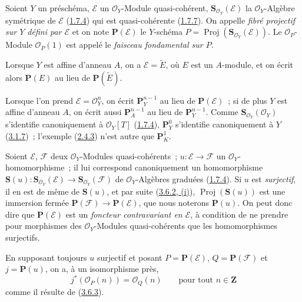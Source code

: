 \begin{definition}[4.1.1]
\label{II.4.1.1-fr}
Soient $Y$ un préschéma, $\mathcal{E}$ un $\mathcal{O}_Y$-Module
quasi-cohérent, $\mathbf{S}_{\mathcal{O}_Y}(\mathcal{E})$ la
$\mathcal{O}_Y$-Algèbre symétrique de $\mathcal{E}$
(\hyperref[II.1.7.4-fr]{1.7.4}) qui est quasi-cohérente
(\hyperref[II.1.7.7-fr]{1.7.7}). On appelle \emph{fibré projectif sur $Y$
défini par $\mathcal{E}$} et on note $\mathbf{P}(\mathcal{E})$ le $Y$-schéma
$P=\operatorname{Proj}(\mathbf{S}_{\mathcal{O}_Y}(\mathcal{E}))$. Le
$\mathcal{O}_P$-Module $\mathcal{O}_P(1)$ est appelé le \emph{faisceau
fondamental sur $P$}.
\end{definition}

Lorsque $Y$ est affine d'anneau $A$, on a $\mathcal{E}=\widetilde{E}$, où
$E$ est un $A$-module, et on écrit alors $\mathbf{P}(E)$ au lieu de
$\mathbf{P}(\widetilde{E})$.

Lorsque l'on prend $\mathcal{E}=\mathcal{O}_Y^n$, on écrit
$\mathbf{P}_Y^{n-1}$ au lieu de $\mathbf{P}(\mathcal{E})$~; si de plus $Y$
est affine d'anneau $A$, on écrit aussi $\mathbf{P}_A^{n-1}$ au lieu de
$\mathbf{P}_Y^{n-1}$. Comme
$\mathbf{S}_{\mathcal{O}_Y}(\mathcal{O}_Y)$ s'identifie canoniquement à
$\mathcal{O}_Y[T]$ (\hyperref[II.1.7.4-fr]{1.7.4}),
$\mathbf{P}_Y^0$ s'identifie canoniquement à $Y$
(\hyperref[II.3.1.7-fr]{3.1.7})~; l'exemple
(\hyperref[II.2.4.3-fr]{2.4.3}) n'est autre que $\mathbf{P}_K^1$.

\begin{env}[4.1.2]
\label{II.4.1.2-fr}
Soient $\mathcal{E}$, $\mathcal{F}$ deux $\mathcal{O}_Y$-Modules
quasi-cohérents~; $u:\mathcal{E}\to\mathcal{F}$ un
$\mathcal{O}_Y$-homomorphisme~; il lui correspond canoniquement un
homomorphisme
$\mathbf{S}(u):\mathbf{S}_{\mathcal{O}_Y}(\mathcal{E})\to
\mathbf{S}_{\mathcal{O}_Y}(\mathcal{F})$ de $\mathcal{O}_Y$-Algèbres
graduées (\hyperref[II.1.7.4-fr]{1.7.4}). Si $u$ est \emph{surjectif}, il en
est de même de $\mathbf{S}(u)$, et par suite
(\hyperref[II.3.6.2-fr]{3.6.2, (i)}),
$\operatorname{Proj}(\mathbf{S}(u))$ est une immersion fermée
$\mathbf{P}(\mathcal{F})\to\mathbf{P}(\mathcal{E})$, que nous noterons
$\mathbf{P}(u)$. On peut donc dire que $\mathbf{P}(\mathcal{E})$ est un
\emph{foncteur contravariant en $\mathcal{E}$}, à condition de ne prendre
pour morphismes des $\mathcal{O}_Y$-Modules quasi-cohérents que les
homomorphismes surjectifs.

En supposant toujours $u$ surjectif et posant
$P=\mathbf{P}(\mathcal{E})$, $Q=\mathbf{P}(\mathcal{F})$ et
$j=\mathbf{P}(u)$, on a, à un isomorphisme près,
\[
\label{II.4.1.2.1-fr}
  j^*(\mathcal{O}_P(n))=\mathcal{O}_Q(n)
  \qquad\text{pour tout }n\in\mathbf{Z}
\tag{4.1.2.1}
\]
comme il résulte de (\hyperref[II.3.6.3-fr]{3.6.3}).
\end{env}

